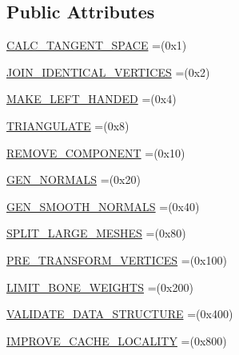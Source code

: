 \subsection*{Public Attributes}
\begin{DoxyCompactItemize}
\item 
\hyperlink{enumjassimp_1_1_ai_post_process_steps_a7b06593c65997d422101152bd1c87557}{C\+A\+L\+C\+\_\+\+T\+A\+N\+G\+E\+N\+T\+\_\+\+S\+P\+A\+C\+E} =(0x1)
\item 
\hyperlink{enumjassimp_1_1_ai_post_process_steps_a8a0dc401e418d7e18272cb5bac85ca45}{J\+O\+I\+N\+\_\+\+I\+D\+E\+N\+T\+I\+C\+A\+L\+\_\+\+V\+E\+R\+T\+I\+C\+E\+S} =(0x2)
\item 
\hyperlink{enumjassimp_1_1_ai_post_process_steps_af605bf70f0a61961ff0efdf9f21e0622}{M\+A\+K\+E\+\_\+\+L\+E\+F\+T\+\_\+\+H\+A\+N\+D\+E\+D} =(0x4)
\item 
\hyperlink{enumjassimp_1_1_ai_post_process_steps_a01837cc450eef4f697a8049dfe60ae49}{T\+R\+I\+A\+N\+G\+U\+L\+A\+T\+E} =(0x8)
\item 
\hyperlink{enumjassimp_1_1_ai_post_process_steps_a323a9c21d2f21f01d3690c3fdee351e8}{R\+E\+M\+O\+V\+E\+\_\+\+C\+O\+M\+P\+O\+N\+E\+N\+T} =(0x10)
\item 
\hyperlink{enumjassimp_1_1_ai_post_process_steps_a72fa11465e238a3a5a156c061f3c68b3}{G\+E\+N\+\_\+\+N\+O\+R\+M\+A\+L\+S} =(0x20)
\item 
\hyperlink{enumjassimp_1_1_ai_post_process_steps_a8467855f4e3d97235e27954a9c983fd4}{G\+E\+N\+\_\+\+S\+M\+O\+O\+T\+H\+\_\+\+N\+O\+R\+M\+A\+L\+S} =(0x40)
\item 
\hyperlink{enumjassimp_1_1_ai_post_process_steps_a94fd8430f743bab4c0b844e0674a4dbf}{S\+P\+L\+I\+T\+\_\+\+L\+A\+R\+G\+E\+\_\+\+M\+E\+S\+H\+E\+S} =(0x80)
\item 
\hyperlink{enumjassimp_1_1_ai_post_process_steps_adf545ba757faa81c1c1dd687a5525d67}{P\+R\+E\+\_\+\+T\+R\+A\+N\+S\+F\+O\+R\+M\+\_\+\+V\+E\+R\+T\+I\+C\+E\+S} =(0x100)
\item 
\hyperlink{enumjassimp_1_1_ai_post_process_steps_a0cbfe3bff3f0f47dd779609cbf977529}{L\+I\+M\+I\+T\+\_\+\+B\+O\+N\+E\+\_\+\+W\+E\+I\+G\+H\+T\+S} =(0x200)
\item 
\hyperlink{enumjassimp_1_1_ai_post_process_steps_a67d8cbf3c7d36d28452d4aee89b81d01}{V\+A\+L\+I\+D\+A\+T\+E\+\_\+\+D\+A\+T\+A\+\_\+\+S\+T\+R\+U\+C\+T\+U\+R\+E} =(0x400)
\item 
\hyperlink{enumjassimp_1_1_ai_post_process_steps_aa33035e8d355e1f579e6c6db9429476c}{I\+M\+P\+R\+O\+V\+E\+\_\+\+C\+A\+C\+H\+E\+\_\+\+L\+O\+C\+A\+L\+I\+T\+Y} =(0x800)

\end{DoxyCompactItemize}
